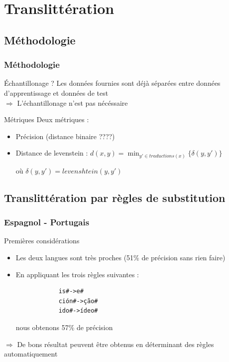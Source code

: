 \documentclass{beamer}
\begin{document}
\section{Translittération}

\subsection{Méthodologie}

\begin{frame}
\frametitle{Méthodologie}

	\begin{block}{Échantillonage ?}
	Les données fournies sont déjà séparées entre données d'apprentissage et données de test\\
	$\Longrightarrow$ L'échantillonage n'est pas nécéssaire
	\end{block}

	\begin{block}{Métriques}
	Deux métriques  :
		\begin{itemize}
		\item Précision (distance binaire ????)
		\item Distance de levenstein : $d(x,y) = \min_{y' \in traductions(x)} \{\delta(y,y')\}$

où $\delta(y,y')=levenshtein(y,y')$
		\end{itemize}		
	\end{block}
\end{frame}

\subsection{Translittération par règles de substitution}


\begin{frame}[fragile]
	\frametitle{Espagnol - Portugais}

	\begin{block}{Premières considérations}
		\begin{itemize}
		\item Les deux langues sont très proches (51\% de précision sans rien faire)
		\item En appliquant les trois règles suivantes : {\scriptsize \begin{verbatim}
			is#->e#
			ción#->ção#
			ido#->ídeo#
			\end{verbatim}}
			nous obtenons 57\% de précision
		\end{itemize}
	\end{block}

	\begin{alertblock}{}
	$\Longrightarrow$ De bons résultat peuvent être obtenus en déterminant des règles automatiquement 
	\end{alertblock}
\end{frame}
\end{document}
